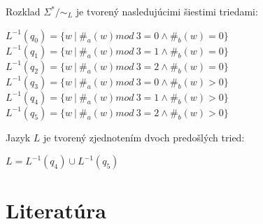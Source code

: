 \documentclass[11pt,a4paper]{article}
\begin{document}
Rozklad $\Sigma^* / \sim_L$ je tvorený nasledujúcimi šiestimi triedami:

\begin{center}
$L^{-1}(q_0) = \{w\ |\ \#_a(w) mod\ 3 = 0 \wedge \#_b(w) = 0\}$\\
$L^{-1}(q_1) = \{w\ |\ \#_a(w) mod\ 3 = 1 \wedge \#_b(w) = 0\}$\\
$L^{-1}(q_2) = \{w\ |\ \#_a(w) mod\ 3 = 2 \wedge \#_b(w) = 0\}$\\
$L^{-1}(q_3) = \{w\ |\ \#_a(w) mod\ 3 = 0 \wedge \#_b(w) > 0\}$\\
$L^{-1}(q_4) = \{w\ |\ \#_a(w) mod\ 3 = 1 \wedge \#_b(w) > 0\}$\\
$L^{-1}(q_5) = \{w\ |\ \#_a(w) mod\ 3 = 2 \wedge \#_b(w) > 0\}$\\
\end{center}

Jazyk $L$ je tvorený zjednotením dvoch predošlých tried:

\begin{center}
$L = L^{-1}(q_4) \cup L^{-1}(q_5)$\\
\end{center}

\newpage
\section{Literatúra}

\begin{flushleft}
    
\end{flushleft}
\end{document}

